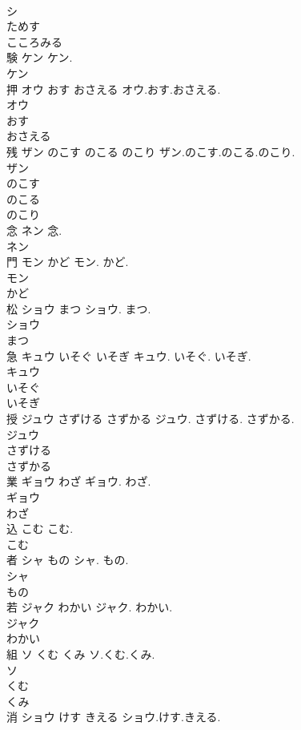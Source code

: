 \documentclass[8pt]{extreport}
\begin{document}
\begin{CJK}{UTF8}{min}
\\	シ
\\	ためす
\\	こころみる
\\	験	ケン	ケン.	
\\	ケン
\\	押	オウ おす おさえる	オウ.おす.おさえる.	
\\	オウ
\\	おす
\\	おさえる
\\	残	ザン のこす のこる のこり	ザン.のこす.のこる.のこり.	
\\	ザン
\\	のこす
\\	のこる
\\	のこり
\\	念	ネン	念.	
\\	ネン
\\	門	モン かど	モン. かど.	
\\	モン
\\	かど
\\	松	ショウ まつ	ショウ. まつ.	
\\	ショウ
\\	まつ
\\	急	キュウ いそぐ いそぎ	キュウ. いそぐ. いそぎ.	
\\	キュウ
\\	いそぐ
\\	いそぎ
\\	授	ジュウ さずける さずかる	ジュウ. さずける. さずかる.	
\\	ジュウ
\\	さずける
\\	さずかる
\\	業	ギョウ わざ	ギョウ. わざ.	
\\	ギョウ
\\	わざ
\\	込	こむ	こむ.	
\\	こむ
\\	者	シャ もの	シャ. もの.	
\\	シャ
\\	もの
\\	若	ジャク わかい	ジャク. わかい.	
\\	ジャク
\\	わかい
\\	組	ソ くむ くみ	ソ.くむ.くみ.	
\\	ソ
\\	くむ
\\	くみ
\\	消	ショウ けす きえる	ショウ.けす.きえる.	

\end{CJK}
\end{document}
